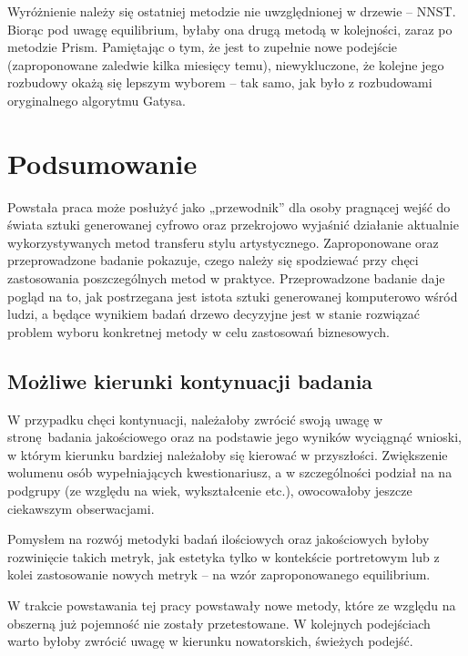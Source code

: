 \documentclass[12pt]{article}
\begin{document}
Wyróżnienie należy się ostatniej metodzie nie uwzględnionej w drzewie – NNST. Biorąc pod uwagę equilibrium, byłaby ona drugą metodą w kolejności, zaraz po metodzie Prism. Pamiętając o tym, że jest to zupełnie nowe podejście (zaproponowane zaledwie kilka miesięcy temu), niewykluczone, że kolejne jego rozbudowy okażą się lepszym wyborem – tak samo, jak było z rozbudowami oryginalnego algorytmu Gatysa.
\newpage

\section*{Podsumowanie}
\indent

Powstała praca może posłużyć jako „przewodnik” dla osoby pragnącej wejść do świata sztuki generowanej cyfrowo oraz przekrojowo wyjaśnić działanie aktualnie wykorzystywanych metod transferu stylu artystycznego. Zaproponowane oraz przeprowadzone badanie pokazuje, czego należy się spodziewać przy chęci zastosowania poszczególnych metod w praktyce. Przeprowadzone badanie daje pogląd na to, jak postrzegana jest istota sztuki generowanej komputerowo wśród ludzi, a będące wynikiem badań drzewo decyzyjne jest w stanie rozwiązać problem wyboru konkretnej metody w celu zastosowań biznesowych.
\subsection*{Możliwe kierunki kontynuacji badania}
\indent

W przypadku chęci kontynuacji, należałoby zwrócić swoją uwagę w stronę badania jakościowego oraz na podstawie jego wyników wyciągnąć wnioski, w którym kierunku bardziej należałoby się kierować w przyszłości. Zwiększenie wolumenu osób wypełniających kwestionariusz, a w szczególności podział na na podgrupy (ze względu na wiek, wykształcenie etc.), owocowałoby jeszcze ciekawszym obserwacjami.

Pomysłem na rozwój metodyki badań ilościowych oraz jakościowych byłoby rozwinięcie takich metryk, jak estetyka tylko w kontekście portretowym lub z kolei zastosowanie nowych metryk – na wzór zaproponowanego equilibrium.

W trakcie powstawania tej pracy powstawały nowe metody, które ze względu na obszerną już pojemność nie zostały przetestowane. W kolejnych podejściach warto byłoby zwrócić uwagę w kierunku nowatorskich, świeżych podejść.

\newpage


\end{document}
